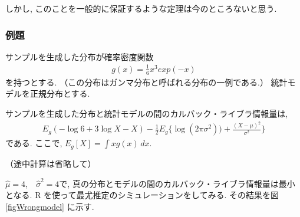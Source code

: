 \documentclass[a4paper, 12pt]{jarticle}
\begin{document}
しかし, このことを一般的に保証するような定理は今のところないと思う. 

\subsubsection{例題}
サンプルを生成した分布が確率密度関数
\begin{align}
g(x) = \frac{1}{6}x^3 exp(-x)
\end{align}
を持つとする. （この分布はガンマ分布と呼ばれる分布の一例である.）
統計モデルを正規分布とする. 

サンプルを生成した分布と統計モデルの間のカルバック・ライブラ情報量は, 
 \begin{align}
 E_g (-\log6+3\log X-X)-\frac{1}{2}E_g\{\log(2\pi \sigma^2)) + \frac{(X-\mu)^2}{\sigma^2}\}
 \end{align}
 である. ここで, $E_g[X] = \int xg(x)\, dx$.
 
（途中計算は省略して）

$\hat \mu=4$,　$\hat \sigma^2=4$で, 真の分布とモデルの間のカルバック・ライブラ情報量は最小となる. 
R を使って最尤推定のシミュレーションをしてみる.
その結果を図\ref{figWrongmodel} に示す.
\end{document}
